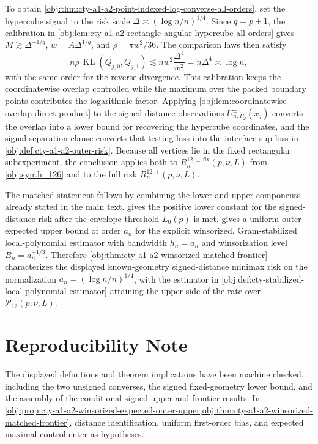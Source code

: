 \documentclass[11pt]{article}
\begin{document}
To obtain \cref{obj:thm:cty-a1-a2-point-indexed-log-converse-all-orders}, set the hypercube signal to the risk scale \(\Delta\asymp(\log n/n)^{1/4}\). Since \(q=p+1\), the calibration in \cref{obj:lem:cty-a1-a2-rectangle-angular-hypercube-all-orders} gives \(M\gtrsim \Delta^{-1/q}\), \(w=A\Delta^{1/q}\), and \(\rho=\pi w^2/36\). The comparison laws then satisfy
\[
n\rho\,\operatorname{KL}(Q_{j,0},Q_{j,1})
\lesssim
n w^2 \frac{\Delta^4}{w^2}
=
n\Delta^4
\asymp
\log n,
\]
with the same order for the reverse divergence. This calibration keeps the coordinatewise overlap controlled while the maximum over the packed boundary points contributes the logarithmic factor. Applying \cref{obj:lem:coordinatewise-overlap-direct-product} to the signed-distance observations \(U^{\pm}_{n,P_\omega}(x_j)\) converts the overlap into a lower bound for recovering the hypercube coordinates, and the signal-separation clause converts that testing loss into the interface sup-loss in \cref{obj:def:cty-a1-a2-outer-risk}. Because all vertices lie in the fixed rectangular subexperiment, the conclusion applies both to \(R^{12,\pm,\mathrm{fix}}_n(p,\nu,L)\) from \cref{obj:synth_126} and to the full risk \(R^{12,\pm}_n(p,\nu,L)\).

The matched statement follows by combining the lower and upper components already stated in the main text.  gives the positive lower constant for the signed-distance risk after the envelope threshold \(L_0(p)\) is met.  gives a uniform outer-expected upper bound of order \(a_n\) for the explicit winsorized, Gram-stabilized local-polynomial estimator with bandwidth \(h_n=a_n\) and winsorization level \(B_n=a_n^{-1/3}\). Therefore \cref{obj:thm:cty-a1-a2-winsorized-matched-frontier} characterizes the displayed known-geometry signed-distance minimax risk on the normalization \(a_n=(\log n/n)^{1/4}\), with the estimator in \cref{obj:def:cty-stabilized-local-polynomial-estimator} attaining the upper side of the rate over \(\mathcal P_{12}(p,\nu,L)\).


\section{Reproducibility Note}
\label{sec:verification-note}

The displayed definitions and theorem implications have been machine checked, including the two unsigned converses, the signed fixed-geometry lower bound, and the assembly of the conditional signed upper and frontier results. In \cref{obj:prop:cty-a1-a2-winsorized-expected-outer-upper,obj:thm:cty-a1-a2-winsorized-matched-frontier}, distance identification, uniform first-order bias, and expected maximal control enter as hypotheses.
\end{document}
